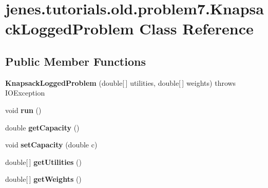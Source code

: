\hypertarget{classjenes_1_1tutorials_1_1old_1_1problem7_1_1_knapsack_logged_problem}{\section{jenes.\-tutorials.\-old.\-problem7.\-Knapsack\-Logged\-Problem Class Reference}
\label{classjenes_1_1tutorials_1_1old_1_1problem7_1_1_knapsack_logged_problem}
}
\subsection*{Public Member Functions}
\begin{DoxyCompactItemize}
\item 
\hypertarget{classjenes_1_1tutorials_1_1old_1_1problem7_1_1_knapsack_logged_problem_a29a58dbca9c08a57879396daab5f3572}{{\bfseries Knapsack\-Logged\-Problem} (double\mbox{[}$\,$\mbox{]} utilities, double\mbox{[}$\,$\mbox{]} weights)  throws I\-O\-Exception }\label{classjenes_1_1tutorials_1_1old_1_1problem7_1_1_knapsack_logged_problem_a29a58dbca9c08a57879396daab5f3572}

\item 
\hypertarget{classjenes_1_1tutorials_1_1old_1_1problem7_1_1_knapsack_logged_problem_a56e70b4e2ab15b82fee574fd3221e1c9}{void {\bfseries run} ()}\label{classjenes_1_1tutorials_1_1old_1_1problem7_1_1_knapsack_logged_problem_a56e70b4e2ab15b82fee574fd3221e1c9}

\item 
\hypertarget{classjenes_1_1tutorials_1_1old_1_1problem7_1_1_knapsack_logged_problem_a929b6e393d0da3396bd235b10996a1a7}{double {\bfseries get\-Capacity} ()}\label{classjenes_1_1tutorials_1_1old_1_1problem7_1_1_knapsack_logged_problem_a929b6e393d0da3396bd235b10996a1a7}

\item 
\hypertarget{classjenes_1_1tutorials_1_1old_1_1problem7_1_1_knapsack_logged_problem_af8fef0686eac745e86c82e000d8056f8}{void {\bfseries set\-Capacity} (double c)}\label{classjenes_1_1tutorials_1_1old_1_1problem7_1_1_knapsack_logged_problem_af8fef0686eac745e86c82e000d8056f8}

\item 
\hypertarget{classjenes_1_1tutorials_1_1old_1_1problem7_1_1_knapsack_logged_problem_a6f9e4d8876f6df43cfbd03f8981cf2e2}{double\mbox{[}$\,$\mbox{]} {\bfseries get\-Utilities} ()}\label{classjenes_1_1tutorials_1_1old_1_1problem7_1_1_knapsack_logged_problem_a6f9e4d8876f6df43cfbd03f8981cf2e2}

\item 
\hypertarget{classjenes_1_1tutorials_1_1old_1_1problem7_1_1_knapsack_logged_problem_a544b9df22c87570cbbe5636ba3af9a10}{double\mbox{[}$\,$\mbox{]} {\bfseries get\-Weights} ()}\label{classjenes_1_1tutorials_1_1old_1_1problem7_1_1_knapsack_logged_problem_a544b9df22c87570cbbe5636ba3af9a10}

\end{DoxyCompactItemize}
